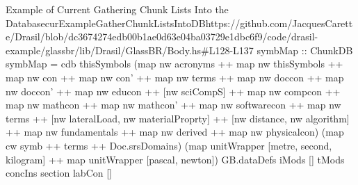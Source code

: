 \begin{haskell}{Example of Current Gathering Chunk Lists Into the Database}{curExampleGatherChunkListsIntoDB}{https://github.com/JacquesCarette/Drasil/blob/dc3674274edb00b1ae0d63e04ba03729e1dbc6f9/code/drasil-example/glassbr/lib/Drasil/GlassBR/Body.hs\#L128-L137}
symbMap :: ChunkDB
symbMap = cdb thisSymbols (map nw acronyms ++ map nw thisSymbols ++ map nw con
  ++ map nw con' ++ map nw terms ++ map nw doccon ++ map nw doccon' ++ map nw educon
  ++ [nw sciCompS] ++ map nw compcon ++ map nw mathcon ++ map nw mathcon'
  ++ map nw softwarecon ++ map nw terms ++ [nw lateralLoad, nw materialProprty]
   ++ [nw distance, nw algorithm] ++
  map nw fundamentals ++ map nw derived ++ map nw physicalcon)
  (map cw symb ++ terms ++ Doc.srsDomains) (map unitWrapper [metre, second, kilogram]
  ++ map unitWrapper [pascal, newton]) GB.dataDefs iMods [] tMods concIns section
  labCon []
\end{haskell}
